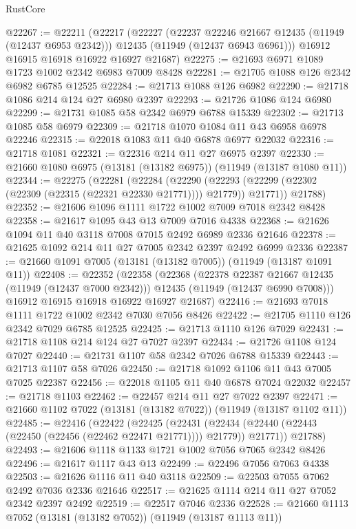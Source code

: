\begin{lexlean}{RustCore}
\begin{coremodule}
@22267 := @22211
    (@22217
      (@22227
        (@22237 @22246 @21667 @12435 (@11949 (@12437 @6953 @2342)))
        @12435
        (@11949 (@12437 @6943 @6961)))
      @16912
      @16915
      @16918
      @16922
      @16927
      @21687)
@22275 := @21693 @6971 @1089 @1723 @1002 @2342 @6983 @7009 @8428
@22281 := @21705 @1088 @126 @2342 @6982 @6785 @12525
@22284 := @21713 @1088 @126 @6982
@22290 := @21718 @1086 @214 @124 @27 @6980 @2397
@22293 := @21726 @1086 @124 @6980
@22299 := @21731 @1085 @58 @2342 @6979 @6788 @15339
@22302 := @21713 @1085 @58 @6979
@22309 := @21718 @1070 @1084 @11 @43 @6958 @6978 @22246
@22315 := @22018 @1083 @11 @40 @6878 @6977 @22032
@22316 := @21718 @1081
@22321 := @22316 @214 @11 @27 @6975 @2397
@22330 := @21660 @1080 @6975 (@13181 (@13182 @6975)) (@11949 (@13187 @1080 @11))
@22344 := @22275
    (@22281
      (@22284
        (@22290 (@22293 (@22299 (@22302 (@22309 (@22315 (@22321 @22330 @21771)))) @21779)) @21771))
      @21788)
@22352 := @21606 @1096 @1111 @1722 @1002 @7009 @7018 @2342 @8428
@22358 := @21617 @1095 @43 @13 @7009 @7016 @4338
@22368 := @21626 @1094 @11 @40 @3118 @7008 @7015 @2492 @6989 @2336 @21646
@22378 := @21625 @1092 @214 @11 @27 @7005 @2342 @2397 @2492 @6999 @2336
@22387 := @21660 @1091 @7005 (@13181 (@13182 @7005)) (@11949 (@13187 @1091 @11))
@22408 := @22352
    (@22358
      (@22368
        (@22378 @22387 @21667 @12435 (@11949 (@12437 @7000 @2342)))
        @12435
        (@11949 (@12437 @6990 @7008)))
      @16912
      @16915
      @16918
      @16922
      @16927
      @21687)
@22416 := @21693 @7018 @1111 @1722 @1002 @2342 @7030 @7056 @8426
@22422 := @21705 @1110 @126 @2342 @7029 @6785 @12525
@22425 := @21713 @1110 @126 @7029
@22431 := @21718 @1108 @214 @124 @27 @7027 @2397
@22434 := @21726 @1108 @124 @7027
@22440 := @21731 @1107 @58 @2342 @7026 @6788 @15339
@22443 := @21713 @1107 @58 @7026
@22450 := @21718 @1092 @1106 @11 @43 @7005 @7025 @22387
@22456 := @22018 @1105 @11 @40 @6878 @7024 @22032
@22457 := @21718 @1103
@22462 := @22457 @214 @11 @27 @7022 @2397
@22471 := @21660 @1102 @7022 (@13181 (@13182 @7022)) (@11949 (@13187 @1102 @11))
@22485 := @22416
    (@22422
      (@22425
        (@22431 (@22434 (@22440 (@22443 (@22450 (@22456 (@22462 @22471 @21771)))) @21779)) @21771))
      @21788)
@22493 := @21606 @1118 @1133 @1721 @1002 @7056 @7065 @2342 @8426
@22496 := @21617 @1117 @43 @13
@22499 := @22496 @7056 @7063 @4338
@22503 := @21626 @1116 @11 @40 @3118
@22509 := @22503 @7055 @7062 @2492 @7036 @2336 @21646
@22517 := @21625 @1114 @214 @11 @27 @7052 @2342 @2397 @2492
@22519 := @22517 @7046 @2336
@22528 := @21660 @1113 @7052 (@13181 (@13182 @7052)) (@11949 (@13187 @1113 @11))

\end{coremodule}
\end{lexlean}
